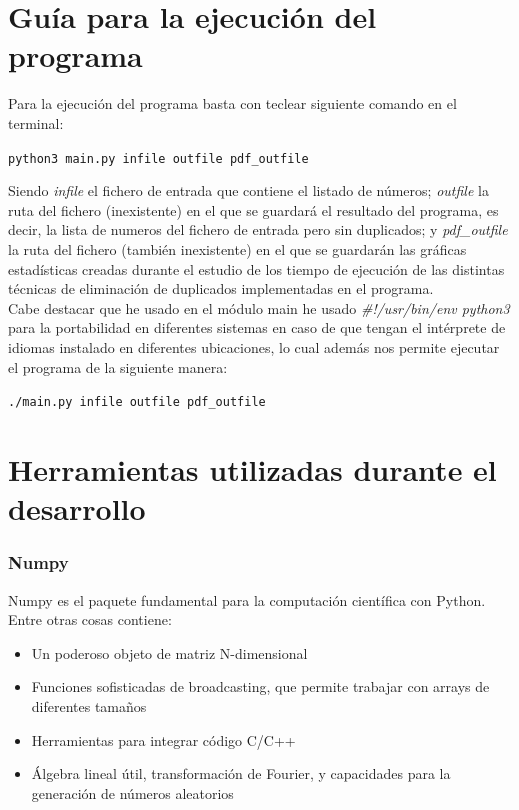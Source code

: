 \documentclass[12 pt]{article}
\begin{document}
\section{Guía para la ejecución del programa}
Para la ejecución del programa basta con teclear siguiente comando en el terminal:
\begin{center}
    \texttt{python3 main.py infile outfile pdf\_outfile}
\end{center}
Siendo \emph{infile} el fichero de entrada que contiene el listado de números; \emph{outfile} la ruta del fichero (inexistente) en el que se guardará el resultado del programa, es decir, la lista de numeros del fichero de entrada pero sin duplicados; y \emph{pdf\_outfile} la ruta del fichero (también inexistente) en el que se guardarán las gráficas estadísticas creadas durante el estudio de los tiempo de ejecución de las distintas técnicas de eliminación de duplicados implementadas en el programa.\\

Cabe destacar que he usado en el módulo main he usado \emph{\#!/usr/bin/env python3} para la portabilidad en diferentes sistemas en caso de que tengan el intérprete de idiomas instalado en diferentes ubicaciones, lo cual además nos permite ejecutar el programa de la siguiente manera:\\

\begin{center}
    \texttt{./main.py infile outfile pdf\_outfile}
\end{center}

\section{Herramientas utilizadas durante el desarrollo}
\subsubsection{Numpy}
Numpy es el paquete fundamental para la computación científica con Python. Entre otras cosas contiene:\\

\begin{itemize}
	\item Un poderoso objeto de matriz N-dimensional
	\item Funciones sofisticadas de broadcasting, que permite trabajar con arrays de diferentes tamaños
	\item Herramientas para integrar código C/C++
	\item Álgebra lineal útil, transformación de Fourier, y capacidades para la generación de números aleatorios
\end{itemize}
\end{document}
